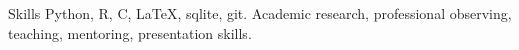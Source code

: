 
\begin{rubric}{Skills}
	Python, R, C, \LaTeX, {\sc sqlite}, git.
\entry*[Misc.]
	Academic research, professional observing, teaching, mentoring, presentation skills.
\end{rubric}
